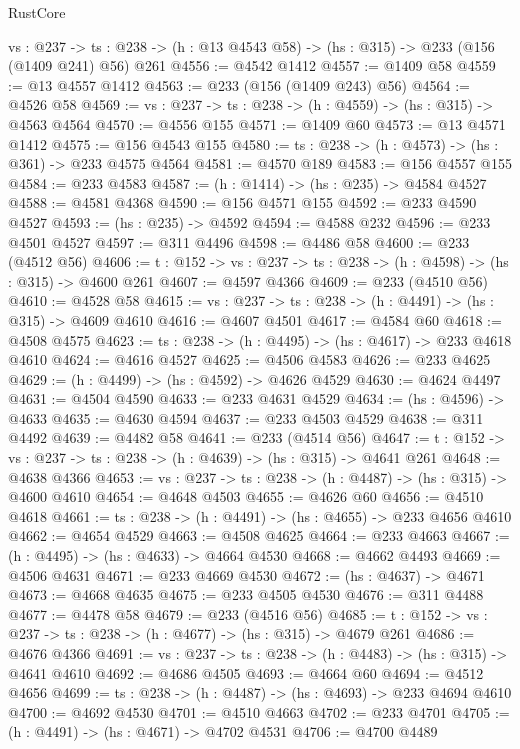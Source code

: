 \begin{lexlean}{RustCore}
\begin{coremodule}
  {vs : @237} ->
  {ts : @238} -> (h : @13 @4543 @58) -> (hs : @315) -> @233 (@156 (@1409 @241) @56) @261
@4556 := @4542 @1412
@4557 := @1409 @58
@4559 := @13 @4557 @1412
@4563 := @233 (@156 (@1409 @243) @56)
@4564 := @4526 @58
@4569 := {vs : @237} -> {ts : @238} -> (h : @4559) -> (hs : @315) -> @4563 @4564
@4570 := @4556 @155
@4571 := @1409 @60
@4573 := @13 @4571 @1412
@4575 := @156 @4543 @155
@4580 := {ts : @238} -> (h : @4573) -> (hs : @361) -> @233 @4575 @4564
@4581 := @4570 @189
@4583 := @156 @4557 @155
@4584 := @233 @4583
@4587 := (h : @1414) -> (hs : @235) -> @4584 @4527
@4588 := @4581 @4368
@4590 := @156 @4571 @155
@4592 := @233 @4590 @4527
@4593 := (hs : @235) -> @4592
@4594 := @4588 @232
@4596 := @233 @4501 @4527
@4597 := @311 @4496
@4598 := @4486 @58
@4600 := @233 (@4512 @56)
@4606 := {t : @152} -> {vs : @237} -> {ts : @238} -> (h : @4598) -> (hs : @315) -> @4600 @261
@4607 := @4597 @4366
@4609 := @233 (@4510 @56)
@4610 := @4528 @58
@4615 := {vs : @237} -> {ts : @238} -> (h : @4491) -> (hs : @315) -> @4609 @4610
@4616 := @4607 @4501
@4617 := @4584 @60
@4618 := @4508 @4575
@4623 := {ts : @238} -> (h : @4495) -> (hs : @4617) -> @233 @4618 @4610
@4624 := @4616 @4527
@4625 := @4506 @4583
@4626 := @233 @4625
@4629 := (h : @4499) -> (hs : @4592) -> @4626 @4529
@4630 := @4624 @4497
@4631 := @4504 @4590
@4633 := @233 @4631 @4529
@4634 := (hs : @4596) -> @4633
@4635 := @4630 @4594
@4637 := @233 @4503 @4529
@4638 := @311 @4492
@4639 := @4482 @58
@4641 := @233 (@4514 @56)
@4647 := {t : @152} -> {vs : @237} -> {ts : @238} -> (h : @4639) -> (hs : @315) -> @4641 @261
@4648 := @4638 @4366
@4653 := {vs : @237} -> {ts : @238} -> (h : @4487) -> (hs : @315) -> @4600 @4610
@4654 := @4648 @4503
@4655 := @4626 @60
@4656 := @4510 @4618
@4661 := {ts : @238} -> (h : @4491) -> (hs : @4655) -> @233 @4656 @4610
@4662 := @4654 @4529
@4663 := @4508 @4625
@4664 := @233 @4663
@4667 := (h : @4495) -> (hs : @4633) -> @4664 @4530
@4668 := @4662 @4493
@4669 := @4506 @4631
@4671 := @233 @4669 @4530
@4672 := (hs : @4637) -> @4671
@4673 := @4668 @4635
@4675 := @233 @4505 @4530
@4676 := @311 @4488
@4677 := @4478 @58
@4679 := @233 (@4516 @56)
@4685 := {t : @152} -> {vs : @237} -> {ts : @238} -> (h : @4677) -> (hs : @315) -> @4679 @261
@4686 := @4676 @4366
@4691 := {vs : @237} -> {ts : @238} -> (h : @4483) -> (hs : @315) -> @4641 @4610
@4692 := @4686 @4505
@4693 := @4664 @60
@4694 := @4512 @4656
@4699 := {ts : @238} -> (h : @4487) -> (hs : @4693) -> @233 @4694 @4610
@4700 := @4692 @4530
@4701 := @4510 @4663
@4702 := @233 @4701
@4705 := (h : @4491) -> (hs : @4671) -> @4702 @4531
@4706 := @4700 @4489

\end{coremodule}
\end{lexlean}
